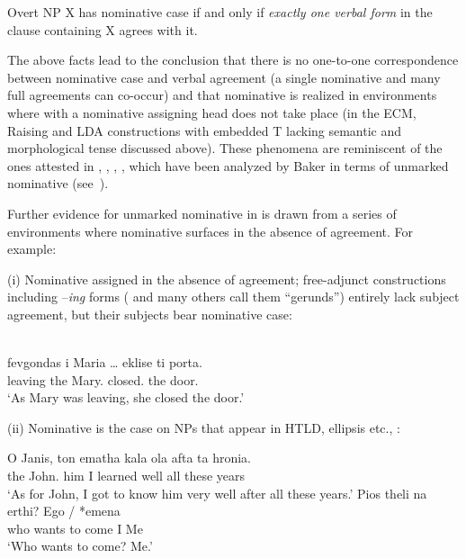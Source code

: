 \documentclass[output=paper]{langsci/langscibook}
\begin{document}
\begin{exe}
    \exi{\eqref{ex:key:13.1}}
    Overt NP X has nominative case if and only if \emph{exactly one verbal
    form} in the clause containing X agrees with it.
\z

The above facts lead to the conclusion that there is no one-to-one
correspondence between nominative case and verbal agreement (a single
nominative and many full agreements can co-occur) and that nominative is
realized in environments where  with a nominative assigning head does not
take place (in the ECM, Raising and \gls{LDA} constructions with embedded T lacking
semantic and morphological tense discussed above). These phenomena are
reminiscent of the ones attested in , ,
, , which have
been analyzed by Baker in terms of unmarked nominative
(see~).

Further evidence for unmarked nominative in  is drawn from a series of
environments where nominative surfaces in the absence of agreement. For
example:

(i) Nominative assigned in the absence of agreement;  free-adjunct
constructions including –\emph{ing} forms (\citealt{Tsimpli2000} and many
others call them \enquote{gerunds}) entirely lack subject agreement, but their
subjects bear nominative case:

\ea%
    \label{ex:key:13.30}\\
    \gll  fevgondas i Maria \dots{}     eklise ti porta.\\
            leaving the Mary.\Nom{} {}  closed.\Tsg{} the door.\Acc{}\\
    \glt  ‘As Mary was leaving, she closed the door.’
\z

(ii) Nominative is the case on NPs that appear in HTLD, ellipsis etc.,
\citet{Schutze2001}:

\ea%
    \label{ex:key:13.31}
	\ea
	\gll  O Janis, ton ematha kala ola afta ta hronia.\\
	    the John.\Nom{} him I learned well all these years\\
	\glt     ‘As for John, I got to know him very well after all these years.’
    \ex
	\gll  Pios theli na erthi?  Ego / *emena\\
            who wants to come  I {} \hphantom{*}Me\\
	\glt     ‘Who wants to come? Me.’
    \z
\z


\end{exe}
\end{document}
